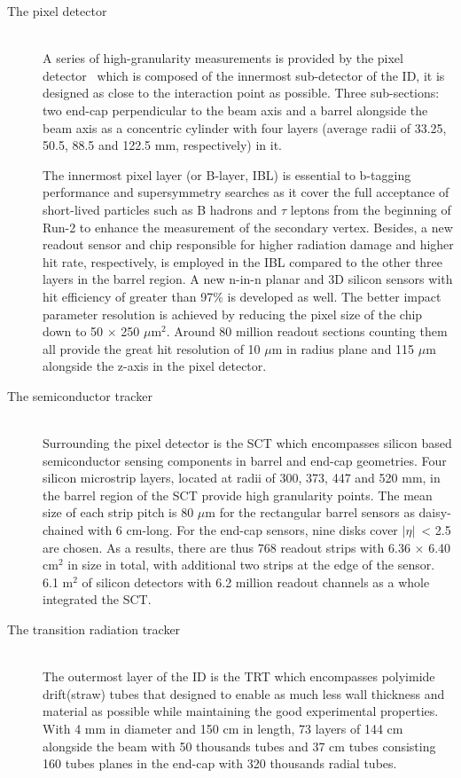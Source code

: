 \documentclass[UTF8,12pt]{ctexart}
\numberwithin{equation}{section}
\def\abseta{$|$$\eta$$|$~}
\begin{document}
\begin{description}
 \item[The pixel detector] \mbox{} \\
A series of high-granularity measurements is provided by the pixel detector~\cite{PIX-2018-001} which is composed of the innermost sub-detector of the ID, it is designed as close to the interaction point as possible. Three sub-sections: two end-cap perpendicular to the beam axis and a barrel alongside the beam axis as a concentric cylinder with four layers (average radii of 33.25, 50.5, 88.5 and 122.5 mm, respectively) in it. 

The innermost pixel layer (or B-layer, IBL) is essential to b-tagging performance and supersymmetry searches as it cover the full acceptance of short-lived particles such as B hadrons and $\tau$ leptons from the beginning of Run-2 to enhance the measurement of the secondary vertex. Besides, a new readout sensor and chip responsible for higher radiation damage and higher hit rate, respectively, is employed in the IBL compared to the other three layers in the barrel region. A new  n-in-n planar and 3D silicon sensors with hit efficiency of greater than 97\% is developed as well. The better impact parameter resolution is achieved by reducing the pixel size of the chip down to 50 $\times$ 250 $\mu$m$^2$.  Around 80 million readout sections counting them all provide the great  hit resolution of 10 $\mu$m in radius plane and 115 $\mu$m alongside the z-axis in the pixel detector.

 \item[The semiconductor tracker] \mbox{} \\
 Surrounding the pixel detector is the SCT which encompasses silicon based semiconductor sensing components in barrel and end-cap geometries. Four silicon microstrip layers, located at radii of 300, 373, 447 and 520 mm, in the barrel region of the SCT provide high granularity points. The mean size of each strip pitch is 80 $\mu$m for the rectangular barrel sensors as daisy-chained with 6 cm-long. For the end-cap sensors, nine disks cover \abseta  < 2.5 are chosen. As a results, there are thus 768 readout strips with 6.36 $\times$ 6.40  cm$^2$ in size in total, with additional two strips at the edge of the sensor. 6.1 m$^2$ of silicon detectors with 6.2 million readout channels as a whole integrated the SCT. 
 
 \item[The transition radiation tracker] \mbox{} \\
 The outermost layer of the ID is the TRT which encompasses polyimide drift(straw) tubes that designed to enable as much less wall thickness and material as possible while maintaining the good experimental properties. With 4 mm in diameter and 150 cm in length, 73 layers of 144 cm alongside the beam with 50 thousands tubes and 37 cm tubes consisting 160 tubes planes in the end-cap with 320 thousands radial tubes.
 

\end{description}
\end{document}
